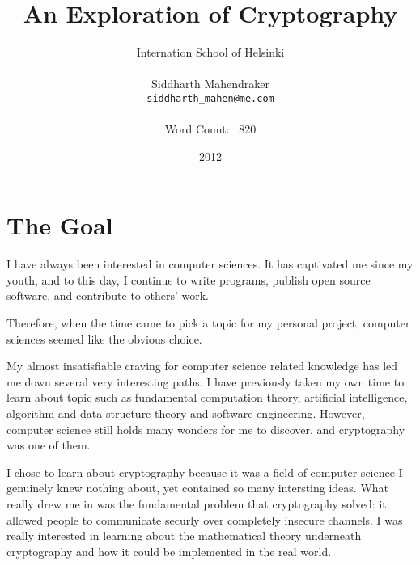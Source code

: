 \documentclass[12pt, a4paper, draft]{report}
\begin{document}
\title{An Exploration of Cryptography}
\author{Internation School of Helsinki\\\\
    Siddharth Mahendraker\\
    \texttt{siddharth\_mahen@me.com}\\\\
    Word Count: ~820}
\date{2012}
\maketitle

\setcounter{page}{1}
\tableofcontents
\clearpage

\section{The Goal}
\setcounter{page}{1}


I have always been interested in computer sciences. It has captivated me
since my youth, and to this day, I continue to write programs, publish
open source software, and contribute to others' work.

Therefore, when the time came to pick a topic for my personal project,
computer sciences seemed like the obvious choice.

My almost insatisfiable craving for computer science related knowledge
has led me down several very interesting paths. I have previously taken my
own time to learn about topic such as fundamental computation theory,
artificial intelligence, algorithm and data structure theory and software
engineering. However, computer science still holds many wonders for
me to discover, and cryptography was one of them.

I chose to learn about cryptography because it was a field of computer
science I genuinely knew nothing about, yet contained so many intersting
ideas. What really drew me in was the fundamental problem that cryptography
solved: it allowed people to communicate securly over completely insecure
channels. I was really interested in learning about the mathematical theory
underneath cryptography and how it could be implemented in the real world.

\end{document}
